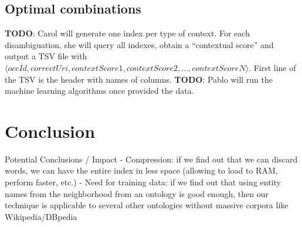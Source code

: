 \documentclass[10pt,a4paper]{article}
\newcommand{\todo}[1]{{\color{red}\textsf{\textbf{TODO}}: #1}}
\begin{document}
\subsection{Optimal combinations}

\todo{Carol will generate one index per type of context. For each disambiguation, she will query all indexes, obtain a ``contextual score'' and output a TSV file with $\langle occId, correctUri, contextScore1, contextScore2, ..., contextScoreN\rangle$. First line of the TSV is the header with names of columns.}
\todo{Pablo will run the machine learning algorithms once provided the data.}

\section{Conclusion}

Potential Conclusions / Impact
- Compression: if we find out that we can discard words, we can have the entire index in less space (allowing to load to RAM, perform faster, etc.)
- Need for training data: if we find out that using entity names from the neighborhood from an ontology is good enough, then our technique is applicable to several other ontologies without massive corpora like Wikipedia/DBpedia



\end{document}
